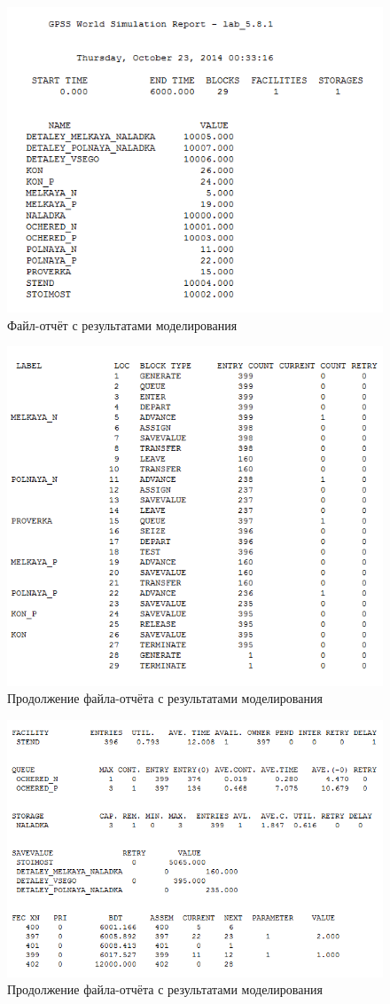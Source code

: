 \begin{figure}[h!]
  \centering
  \includegraphics[width=0.75\linewidth]{pic/report_1}
  \caption{Файл-отчёт с результатами моделирования}
  \label{pic:report_1}
\end{figure}

\begin{figure}[h!]
  \centering
  \includegraphics[width=0.75\linewidth]{pic/report_2}
  \caption{Продолжение файла-отчёта с результатами моделирования}
  \label{pic:report_2}
\end{figure}

\newpage

\begin{figure}[h!]
  \centering
  \includegraphics[width=0.9\linewidth]{pic/report_3}
  \caption{Продолжение файла-отчёта с результатами моделирования}
  \label{pic:report_3}
\end{figure}

